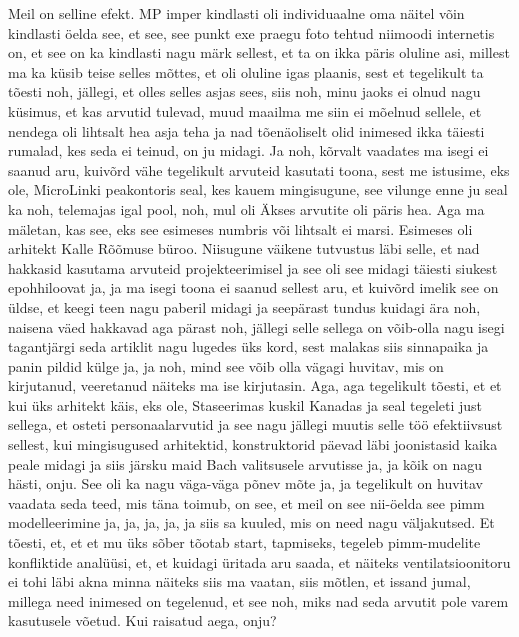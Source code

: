 Meil on selline efekt.
MP imper kindlasti oli individuaalne oma näitel võin kindlasti öelda see, et see, see punkt exe praegu foto tehtud niimoodi internetis on, et see on ka kindlasti nagu märk sellest, et ta on ikka päris oluline asi, millest ma ka küsib teise selles mõttes, et oli oluline igas plaanis, sest et tegelikult ta tõesti noh, jällegi, et olles selles asjas sees, siis noh, minu jaoks ei olnud nagu küsimus, et kas arvutid tulevad, muud maailma me siin ei mõelnud sellele, et nendega oli lihtsalt hea asja teha ja nad tõenäoliselt olid inimesed ikka täiesti rumalad, kes seda ei teinud, on ju midagi. Ja noh, kõrvalt vaadates ma isegi ei saanud aru, kuivõrd vähe tegelikult arvuteid kasutati toona, sest me istusime, eks ole, MicroLinki peakontoris seal, kes kauem mingisugune, see vilunge enne ju seal ka noh, telemajas igal pool, noh, mul oli Äkses arvutite oli päris hea. Aga ma mäletan, kas see, eks see esimeses numbris või lihtsalt ei marsi. Esimeses oli arhitekt Kalle Rõõmuse büroo.
Niisugune väikene tutvustus läbi selle, et nad hakkasid kasutama arvuteid projekteerimisel ja see oli see midagi täiesti siukest epohhiloovat ja, ja ma isegi toona ei saanud sellest aru, et kuivõrd imelik see on üldse, et keegi teen nagu paberil midagi ja seepärast tundus kuidagi ära noh, naisena väed hakkavad aga pärast noh, jällegi selle sellega on võib-olla nagu isegi tagantjärgi seda artiklit nagu lugedes üks kord, sest malakas siis sinnapaika ja panin pildid külge ja, ja noh, mind see võib olla vägagi huvitav, mis on kirjutanud, veeretanud näiteks ma ise kirjutasin. Aga, aga tegelikult tõesti, et et kui üks arhitekt käis, eks ole, Staseerimas kuskil Kanadas ja seal tegeleti just sellega, et osteti personaalarvutid ja see nagu jällegi muutis selle töö efektiivsust sellest, kui mingisugused arhitektid, konstruktorid päevad läbi joonistasid kaika peale midagi ja siis järsku maid Bach valitsusele arvutisse ja, ja kõik on nagu hästi, onju. See oli ka nagu väga-väga põnev mõte ja, ja tegelikult on huvitav vaadata seda teed, mis täna toimub, on see, et meil on see nii-öelda see pimm modelleerimine ja, ja, ja, ja, ja siis sa kuuled, mis on need nagu väljakutsed. Et tõesti, et, et et mu üks sõber tõotab start, tapmiseks, tegeleb pimm-mudelite konfliktide analüüsi, et, et kuidagi üritada aru saada, et näiteks ventilatsioonitoru ei tohi läbi akna minna näiteks siis ma vaatan, siis mõtlen, et issand jumal, millega need inimesed on tegelenud, et see noh, miks nad seda arvutit pole varem kasutusele võetud.
Kui raisatud aega, onju?
